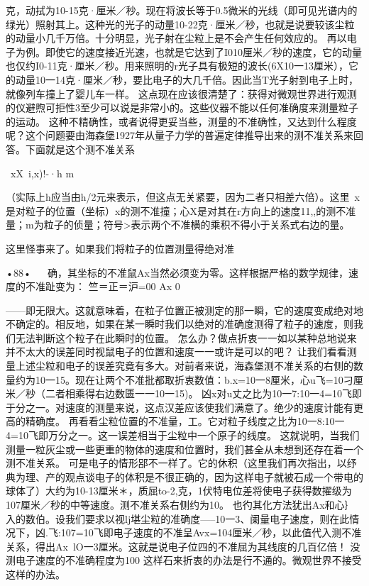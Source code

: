 克，动拭为10-15克·厘米／秒。现在将波长等于0.5微米的光线（即可见光谱内的绿光）照射其上。这种光的光子的动量10-22克·厘米／秒，也就是说要较该尘粒的动量小几千万倍。十分明显，光子射在尘粒上是不会产生任何效应的。
再以电子为例。即使它的速度接近光速，也就是它达到了I010厘米／秒的速度，它的动量也仅约I0-11克·厘米／秒。用来照明的r光子具有极短的波长(6X10一13厘米），它的动量10一14克·厘米／秒，要比电子的大几千倍。因此当T光子射到电子上时，就像列车撞上了婴儿车一样。
这点现在应该很清楚了：获得对微观世界进行观测的仪避煦可拒性3至少可以说是非常小的。这些仪器不能以任何准确度来测量粒子的运动。
这种不精确性，或者说得更妥当些，测量的不准确性，又达到什么程度呢？这个问题要由海森堡1927年从量子力学的普遍定律推导出来的测不准关系来回答。下面就是这个测不准关系

~xX~i,x)!-·h
m

（实际上h应当由h/2元来表示，但这点无关紧要，因为二者只相差六倍）。这里~x是对粒子的位置（坐标）x的测不准撞；心X是对其在r方向上的速度11,,的测不准量；m为粒子的侦量；符号>表示两个不准横的乘积不得小于关系式右边的量。

这里怪事来了。如果我们将粒子的位置测量得绝对准

•88•
  
确，其坐标的不准鼠Ax当然必须变为零。这样根据严格的数学规律，速度的不准趾变为：
竺＝正＝沪=00
	Ax	0

——即无限大。这就意味着，在粒子位置正被测定的那一瞬，它的速度变成绝对地不确定的。相反地，如果在某一瞬时我们以绝对的准确度测得了粒子的速度，则我们无法判断这个粒子在此瞬时的位置。
怎么办？做点折衷一一如以某种总地说来并不太大的误差同时视鼠电子的位置和速度一一或许是可以的吧？
让我们看看测量上述尘粒和电子的误差究竟有多大。对前者来说，海森堡测不准关系的右侧的数量约为10一15。现在让两个不准批都取折衷数值：b.x=10一8厘米，心u飞=10刁厘米／秒（二者相乘得右边数匮一一10一15)。
凶x对u丈之比为10一7:10一4=10飞即于分之一。对速度的测量来说，这点汉差应该使我们满意了。绝少的速度计能有更高的精确度。
再看看尘粒位置的不准量，工。它对粒子线度之比为10一8:10一4=10飞即万分之一。这一误差相当于尘粒中一个原子的线度。
这就说明，当我们测量一粒灰尘或一些更重的物体的速度和位置时，我们甚全从未想到还存在着一个测不准关系。
可是电子的情形郘不一样了。它的休积（这里我们再次指出，以纾典为理、产的观点谈电子的体积是不很正确的，因为这样电子就被石成一个带电的球体了）大约为10-13厘米＊，质屈to-2,克，1伏特电位差将使电子获得数擢级为107厘米／秒的中等速度。测不准关系右侧约为10。
也彴其化方法犹出Ax和心｝入的数伯。设我们要求以视lj堪尘粒的准确度—--10一3、阑量电子速度，则在此情况下，凶.飞:107=10飞即电子速度的不准呈Avx=104厘米／秒，以此值代入测不准关系，得出Ax~lO一3厘米。这就是说电子位四的不准屈为其线度的几百亿倍！
没测电子速度的不准确程度为100%
这样石来折衷的办法是行不通的。微观世界不接受这样的办法。


